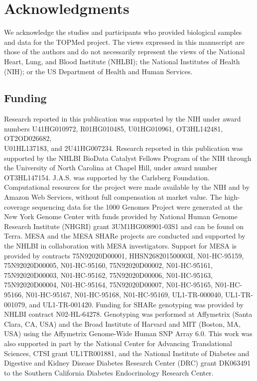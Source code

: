 \documentclass[11pt]{ucscthesis}
\begin{document}
\section{Acknowledgments}
We acknowledge the studies and participants who provided biological samples and data for the TOPMed project.
The views expressed in this manuscript are those of the authors and do not necessarily represent the views of the National Heart, Lung, and Blood Institute (NHLBI); the National Institutes of Health (NIH); or the US Department of Health and Human Services.
\subsection{Funding}
Research reported in this publication was supported by the NIH under award numbers U41HG010972, R01HG010485, U01HG010961, OT3HL142481, OT2OD026682, \\ U01HL137183, and 2U41HG007234.
Research reported in this publication was supported by the NHLBI BioData Catalyst Fellows Program of the NIH through the University of North Carolina at Chapel Hill, under award number OT3HL147154. J.A.S. was supported by the Carlsberg Foundation.
Computational resources for the project were made available by the NIH and by Amazon Web Services, without full compensation at market value.
The high-coverage sequencing data for the 1000 Genomes Project were generated at the New York Genome Center with funds provided by National Human Genome Research Institute (NHGRI) grant 3UM1HG008901-03S1 and can be found on Terra.
MESA and the MESA SHARe projects are conducted and supported by the NHLBI in collaboration with MESA investigators.
Support for MESA is provided by contracts 75N92020D00001, HHSN268201500003I, N01-HC-95159, 75N92020D00005, N01-HC-95160, 75N92020D00002, N01-HC-95161,\\ 75N92020D00003, N01-HC-95162, 75N92020D00006, N01-HC-95163, 75N92020D00004, N01-HC-95164, 75N92020D00007, N01-HC-95165, N01-HC-95166, N01-HC-95167, N01-HC-95168, N01-HC-95169, UL1-TR-000040, UL1-TR-001079, and UL1-TR-001420.
Funding for SHARe genotyping was provided by NHLBI contract N02-HL-64278.
Genotyping was performed at Affymetrix (Santa Clara, CA, USA) and the Broad Institute of Harvard and MIT (Boston, MA, USA) using the Affymetrix Genome-Wide Human SNP Array 6.0.
This work was also supported in part by the National Center for Advancing Translational Sciences, CTSI grant UL1TR001881, and the National Institute of Diabetes and Digestive and Kidney Disease Diabetes Research Center (DRC) grant DK063491 to the Southern California Diabetes Endocrinology Research Center.
\end{document}
